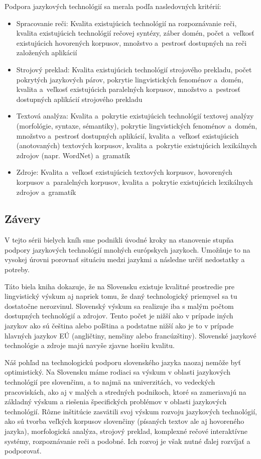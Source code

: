 \begin{multicols}{2}
Podpora jazykových technológií sa merala podľa nasledovných kritérií:

\begin{itemize}
\item Spracovanie reči: Kvalita existujúcich technológií na rozpoznávanie reči, kvalita existujúcich technológií rečovej syntézy, záber domén, počet a~veľkosť existujúcich hovorených korpusov, množstvo a~pestrosť dostupných na reči založených aplikácií
\item Strojový preklad: Kvalita existujúcich technológií strojového prekladu, počet pokrytých jazykových párov, pokrytie lingvistických fenoménov a~domén, kvalita a~veľkosť existujúcich paralelných korpusov, množstvo a~pestrosť dostupných aplikácií strojového prekladu
\item Textová analýza: Kvalita a~pokrytie existujúcich technológií textovej analýzy (morfológie, syntaxe, sémantiky), pokrytie lingvistických fenoménov a~domén, množstvo a~pestrosť dostupných aplikácií, kvalita a~veľkosť existujúcich (anotovaných) textových korpusov, kvalita a~pokrytie existujúcich lexikálnych zdrojov (napr. WordNet) a~gramatík
\item Zdroje: Kvalita a~veľkosť existujúcich textových korpusov, hovorených korpusov a~paralelných korpusov, kvalita a~pokrytie existujúcich lexikálnych zdrojov a~gramatík
\end{itemize} 

\subsection{Závery}
V tejto sérii bielych kníh sme podnikli úvodné kroky na stanovenie
stupňa podpory jazykových technológií mnohých európskych jazykoch. Umožňuje to
na vysokej úrovni porovnať situáciu medzi jazykmi a následne určiť nedostatky a
potreby.

Táto biela kniha dokazuje, že na Slovensku existuje kvalitné prostredie pre
lingvistický výskum aj napriek tomu, že daný technologický priemysel sa tu
dostatočne nerozvinul. Slovenský výskum sa realizuje iba s malým počtom
dostupných technológií a zdrojov. Tento počet je nižší ako v prípade iných
jazykov ako sú čeština alebo poľština a podstatne nižší ako je to v prípade
hlavných jazykov EÚ (angličtiny, nemčiny alebo francúzštiny). Slovenské jazykové
technológie a zdroje majú navyše zjavne horšiu kvalitu.

Náš pohľad na technologickú podporu slovenského jazyka naozaj nemôže byť
optimistický. Na Slovensku máme rodiaci sa výskum v oblasti jazykových
technológií pre slovenčinu, a to najmä na univerzitách, vo vedeckých
pracoviskách, ako aj v malých a stredných podnikoch, ktoré sa zameriavajú na
základný výskum a riešenia špecifických problémov v oblasti jazykových
technológií. Rôzne inštitúcie zasvätili svoj výskum rozvoju jazykových
technológií, ako sú tvorba veľkých korpusov slovenčiny (písaných textov ale aj
hovoreného jazyka), morfologická analýza, strojový preklad, komplexné
rečové interaktívne systémy, rozpoznávanie reči a podobné.  Ich rozvoj je však
nutné ďalej rozvíjať a podporovať.


\end{multicols}
